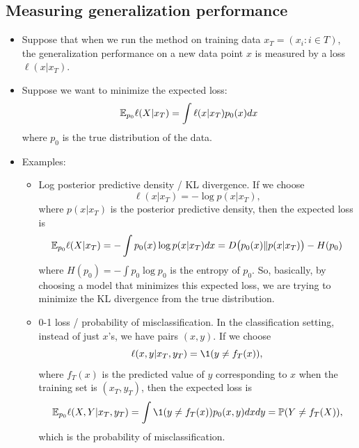 \documentclass[12pt]{article}
\begin{document}
\subsection*{Measuring generalization performance}
\begin{itemize}
\item Suppose that when we run the method on training data $x_T = (x_i : i \in T)$, the generalization performance on a new data point $x$ is measured by a loss $\ell(x | x_T)$. 
\item Suppose we want to minimize the expected loss:
$$ \mathbb{E}_{p_0} \ell(X | x_T) = \int \ell(x | x_T)p_0(x) d x $$
where $p_0$ is the true distribution of the data. 
\item Examples:
\begin{itemize}
\item Log posterior predictive density / KL divergence. If we choose $$\ell(x | x_T) = - \log p(x | x_T),$$ where $p(x | x_T)$ is the posterior predictive density, then the expected loss is
$$ \mathbb{E}_{p_0} \ell(X | x_T) = -\int p_0(x) \log p(x | x_T) d x
 = D\big(p_0(x) \| p(x | x_T) \big) - H(p_0) $$
where $H(p_0) = -\int p_0 \log p_0$ is the entropy of $p_0$. So, basically, by choosing a model that minimizes this expected loss, we are trying to minimize the KL divergence from the true distribution.
\item 0-1 loss / probability of misclassification. In the classification setting, instead of just $x$'s, we have pairs $(x,y)$.  If we choose $$\ell(x,y | x_T,y_T) = \1(y \neq f_T(x)),$$ where $f_T(x)$ is the predicted value of $y$ corresponding to $x$ when the training set is $(x_T,y_T)$, then the expected loss is
$$ \E_{p_0} \ell(X,Y | x_T,y_T) = \int \1(y \neq f_T(x)) p_0(x,y) d x d y = \Pr(Y \neq f_T(X)),$$
which is the probability of misclassification.
\end{itemize}
\end{itemize}
\end{document}
